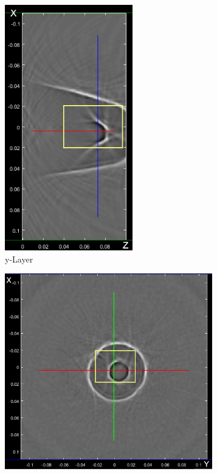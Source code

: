 \begin{figure}[H]
\begin{subfigure}[b]{0.49\textwidth}
         \includegraphics[width=0.61\textwidth]{Graphics/Results/Olive_Standart_reco_example/olive_standart_reconstruction_whole_volume_y_layer.png}
         \caption{y-Layer}
         \label{fig:res:reflec_image_olive_xyz_y}
     \end{subfigure}
     \hfill
     \begin{subfigure}[b]{0.55\textwidth}
         \centering
         \includegraphics[width=0.99\textwidth]{Graphics/Results/Olive_Standart_reco_example/olive_standart_reconstruction_whole_volume_z_layer.png}

\end{subfigure}
\end{figure}
